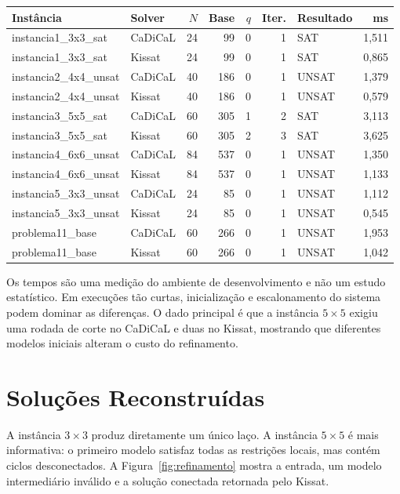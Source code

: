 \documentclass[11pt,a4paper]{article}
\begin{document}
\begin{center}
\scriptsize
\begin{tabular}{l l r r r r l r}
\toprule
Instância & Solver & $N$ & Base & $q$ & Iter. & Resultado & ms \\
\midrule
instancia1\_3x3\_sat & CaDiCaL & 24 & 99 & 0 & 1 & SAT & 1,511 \\
instancia1\_3x3\_sat & Kissat & 24 & 99 & 0 & 1 & SAT & 0,865 \\
instancia2\_4x4\_unsat & CaDiCaL & 40 & 186 & 0 & 1 & UNSAT & 1,379 \\
instancia2\_4x4\_unsat & Kissat & 40 & 186 & 0 & 1 & UNSAT & 0,579 \\
instancia3\_5x5\_sat & CaDiCaL & 60 & 305 & 1 & 2 & SAT & 3,113 \\
instancia3\_5x5\_sat & Kissat & 60 & 305 & 2 & 3 & SAT & 3,625 \\
instancia4\_6x6\_unsat & CaDiCaL & 84 & 537 & 0 & 1 & UNSAT & 1,350 \\
instancia4\_6x6\_unsat & Kissat & 84 & 537 & 0 & 1 & UNSAT & 1,133 \\
instancia5\_3x3\_unsat & CaDiCaL & 24 & 85 & 0 & 1 & UNSAT & 1,112 \\
instancia5\_3x3\_unsat & Kissat & 24 & 85 & 0 & 1 & UNSAT & 0,545 \\
problema11\_base & CaDiCaL & 60 & 266 & 0 & 1 & UNSAT & 1,953 \\
problema11\_base & Kissat & 60 & 266 & 0 & 1 & UNSAT & 1,042 \\
\bottomrule
\end{tabular}
\end{center}

Os tempos são uma medição do ambiente de desenvolvimento e não um estudo estatístico. Em execuções tão curtas, inicialização e escalonamento do sistema podem dominar as diferenças. O dado principal é que a instância $5\times5$ exigiu uma rodada de corte no CaDiCaL e duas no Kissat, mostrando que diferentes modelos iniciais alteram o custo do refinamento.
\newpage

\section{Soluções Reconstruídas}
A instância $3\times3$ produz diretamente um único laço. A instância $5\times5$ é mais informativa: o primeiro modelo satisfaz todas as restrições locais, mas contém ciclos desconectados. A Figura~\ref{fig:refinamento} mostra a entrada, um modelo intermediário inválido e a solução conectada retornada pelo Kissat.
\end{document}
